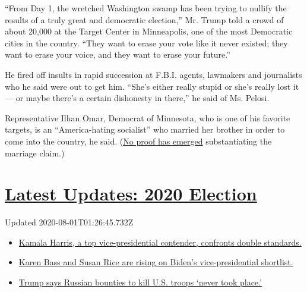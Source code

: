 ``From Day 1, the wretched Washington swamp has been trying to nullify
the results of a truly great and democratic election,'' Mr. Trump told a
crowd of about 20,000 at the Target Center in Minneapolis, one of the
most Democratic cities in the country. ``They want to erase your vote
like it never existed; they want to erase your voice, and they want to
erase your future.''

He fired off insults in rapid succession at F.B.I. agents, lawmakers and
journalists who he said were out to get him. ``She's either really
stupid or she's really lost it --- or maybe there's a certain dishonesty
in there,'' he said of Ms. Pelosi.

Representative Ilhan Omar, Democrat of Minnesota, who is one of his
favorite targets, is an ``America-hating socialist'' who married her
brother in order to come into the country, he said.
(\href{https://www.nytimes.com/2019/07/18/us/politics/trump-ilhan-omar-fact-check.html}{No
proof has emerged} substantiating the marriage claim.)

\hypertarget{latest-updates-2020-election}{%
\section{\texorpdfstring{\href{https://www.nytimes.com/2020/07/31/us/elections/biden-vs-trump.html?action=click\&pgtype=Article\&state=default\&region=MAIN_CONTENT_1\&context=storylines_live_updates}{Latest
Updates: 2020
Election}}{Latest Updates: 2020 Election}}\label{latest-updates-2020-election}}

Updated 2020-08-01T01:26:45.732Z

\begin{itemize}
\tightlist
\item
  \href{https://www.nytimes.com/2020/07/31/us/elections/biden-vs-trump.html?action=click\&pgtype=Article\&state=default\&region=MAIN_CONTENT_1\&context=storylines_live_updates\#link-29fdff45}{Kamala
  Harris, a top vice-presidential contender, confronts double
  standards.}
\item
  \href{https://www.nytimes.com/2020/07/31/us/elections/biden-vs-trump.html?action=click\&pgtype=Article\&state=default\&region=MAIN_CONTENT_1\&context=storylines_live_updates\#link-13ec3d9c}{Karen
  Bass and Susan Rice are rising on Biden's vice-presidential
  shortlist.}
\item
  \href{https://www.nytimes.com/2020/07/31/us/elections/biden-vs-trump.html?action=click\&pgtype=Article\&state=default\&region=MAIN_CONTENT_1\&context=storylines_live_updates\#link-49e9a016}{Trump
  says Russian bounties to kill U.S. troops `never took place.'}
\end{itemize}

